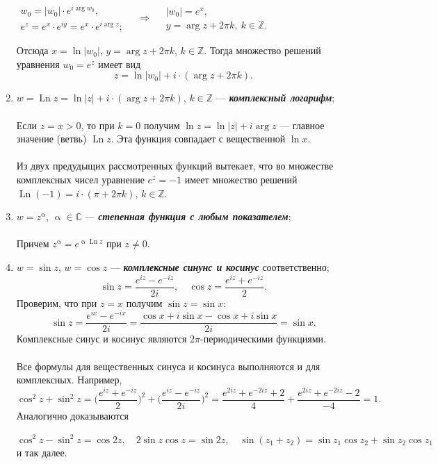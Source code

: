 \documentclass[a4paper, 12pt]{article}
\newcommand{\Cm}{\mathbb{C}}
\newcommand{\Z}{\mathbb{Z}}
\renewcommand{\alpha}{\upalpha}
\newcommand{\Ln}{\operatorname{Ln}}
\newcommand\ef[1]{e^{i#1}}
\begin{document}
\begin{enumerate}
	\begin{center}
		$\begin{matrix}
			w_0 = |w_0|\cdot e^{i\arg w_0},\\
			e^z = e^x\cdot e^{iy} = e^x \cdot \ef{\arg z};
		\end{matrix}\quad \Longrightarrow\quad  \begin{matrix}
		|w_0|=e^x,\\
		y = \arg z + 2\pi k,\ k\in \Z.
	\end{matrix}$
	\end{center}
Отсюда $x = \ln|w_0|$, $y = \arg z + 2\pi k$, $k\in\Z$. Тогда множество решений уравнения $w_0 = e^z$ имеет вид $$z = \ln |w_0|+i\cdot (\arg z +2\pi k).$$
\item $w = \Ln z = \ln|z| + i\cdot (\arg z + 2\pi k)$, $k\in \Z$ --- \textbf{\textit{комплексный логарифм}};\\\\
Если $z = x > 0$, то при $k = 0$ получим $\ln z = \ln |z| + i\arg z$ --- главное значение (ветвь) $\Ln z$. Эта функция совпадает с вещественной $\ln x$.\\\\
Из двух предудыщих рассмотренных функций вытекает, что во множестве комплексных чисел уравнение $e^z = -1$ имеет множество решений $\Ln(-1) = i\cdot (\pi+ 2\pi k)$, $k\in \Z$.
\item $w = z^\alpha$, $\alpha \in \Cm$ --- \textbf{\textit{степенная функция с любым показателем}};\\\\
Причем $z ^\alpha = e^{\alpha \Ln z}$ при $z \ne 0$.
\item $w = \sin z$, $w = \cos z$ --- \textbf{\textit{комплексные синунс и косинус}} соответственно;
$$\sin z = \dfrac{e^{iz} - e^{-iz}}{2i},\quad \cos z = \dfrac{e^{iz} + e^{-iz}}{2}.$$
Проверим, что при $z = x$ получим $\sin z = \sin x$:
$$\sin z = \dfrac{e^{ix} - e^{-ix}}{2i}=\dfrac{\cos x + i\sin x - \cos x + i\sin x}{2i} = \sin x.$$
Комплексные синус и косинус являются $2\pi$-периодическими функциями.\\\\
Все формулы для вещественных синуса и косинуса выполняются и для комплексных. Например, $$\cos^2 z + \sin^2z = \Big(\dfrac{e^{iz} + e^{-iz}}{2}\Big)^2 + \Big(\dfrac{e^{iz} - e^{-iz}}{2i}\Big)^2 = \dfrac{e^{2iz} + e^{-2iz} + 2}{4} + \dfrac{e^{2iz} + e^{-2iz} -2}{-4} = 1.$$
Аналогично доказываются 
\begin{center}
	$\cos ^2z -\sin^2z = \cos 2z,\quad 2\sin z\cos z = \sin2z,\quad \sin(z_1 + z_2) = \sin z_1 \cos z_2 + \sin z_2 \cos z_1$ и так далее.
\end{center}
\end{enumerate}
\end{document}
